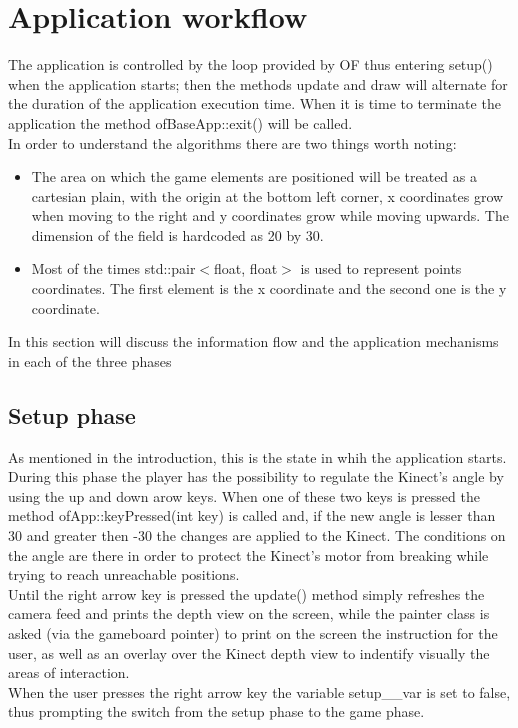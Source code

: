 \documentclass[]{article}
\begin{document}
\section{Application workflow}
The application is controlled by the loop provided by OF thus entering setup() when the application starts; then the methods update and draw will alternate for the duration of the application execution time. When it is time to terminate the application the method ofBaseApp::exit() will be called.\\
In order to understand the algorithms there are two things worth noting:
\begin{itemize}
	\item The area on which the game elements are positioned will be treated as a cartesian plain, with the origin at the bottom left corner, x coordinates grow when moving to the right and y coordinates grow while moving upwards. The dimension of the field is hardcoded as 20 by 30.
	\item Most of the times std::pair$<$float, float$>$ is used to represent points coordinates. The first element is the x coordinate and the second one is the y coordinate. 
\end{itemize} 
In this section will discuss the information flow and the application mechanisms in each of the three phases
\subsection{Setup phase}
As mentioned in the introduction, this is the state in whih the application starts. During this phase the player has the possibility to regulate the Kinect's angle by using the up and down arow keys. When one of these
two keys is pressed the method ofApp::keyPressed(int key) is called and, if the new angle is lesser than 30 and greater then -30 the changes are applied to the Kinect.
The conditions on the angle are there in order to protect the Kinect's motor from breaking while trying to reach unreachable positions.\\
Until the right arrow key is pressed the update() method simply refreshes the camera feed and prints the depth view on the screen, while the painter class is asked (via the gameboard pointer) to print on the screen the instruction for the user, as well as an overlay over the Kinect depth view to indentify visually the areas of interaction.\\
When the user presses the right arrow key the variable setup\_\_var is set to false, thus prompting the switch from the setup phase to the game phase.
\newpage
\end{document}
